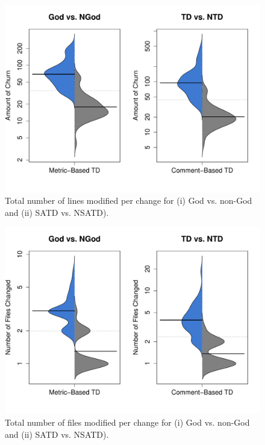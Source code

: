 \begin{figure}[!hp]
	\centering
	\includegraphics[width=120mm]{figures/chapter4/rq3_churn}
	\caption{Total number of lines modified per change for (i) God vs. non-God and (ii) SATD vs. NSATD).}
	\label{figure:ch4_tlcpc}
\end{figure}



\begin{figure}[!hp]
	\centering
	\includegraphics[width=120mm]{figures/chapter4/rq3_nf}
	\caption{Total number of files modified per change for (i) God vs. non-God and (ii) SATD vs. NSATD).}
	\label{figure:ch4_tfcpc}
\end{figure}

